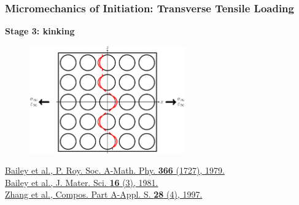\documentclass[first,firstsupp,lastsupp,last,hyperref,table]{ETHclass}
\begin{document}
\begin{frame}
\frametitle{\vspace{0.2cm}\small Micromechanics of Initiation: Transverse Tensile Loading}
\vspace{-0.5cm}
\centering
\begin{alertblock}{\centering\scriptsize\bf Stage 3: kinking}
\vspace{-0.25cm}
\begin{figure}
\centering
\includegraphics[width=0.6\textwidth]{stage3-kinking.pdf}
\end{figure}
\end{alertblock}
\vspace{-0.5cm}
\pgfmathsetmacro{}
\pgfmathsetmacro{}
{\fontsize{\fontsizeref}{\stretchref} \selectfont \href{https://doi.org/10.1098/rspa.1979.0071}{Bailey et al., P. Roy. Soc. A-Math. Phy. \textbf{366} (1727), 1979.}}\\\vspace{-5pt}
{\fontsize{\fontsizeref}{\stretchref} \selectfont \href{https://doi.org/10.1007/BF00552203}{Bailey et al., J. Mater. Sci. \textbf{16} (3), 1981.}}\\\vspace{-5pt}
{\fontsize{\fontsizeref}{\stretchref} \selectfont \href{https://doi.org/10.1016/S1359-835X(96)00123-6}{Zhang et al., Compos. Part A-Appl. S. \textbf{28} (4), 1997.}}
\end{frame}

\addtocounter{framenumber}{-1}
\end{document}
